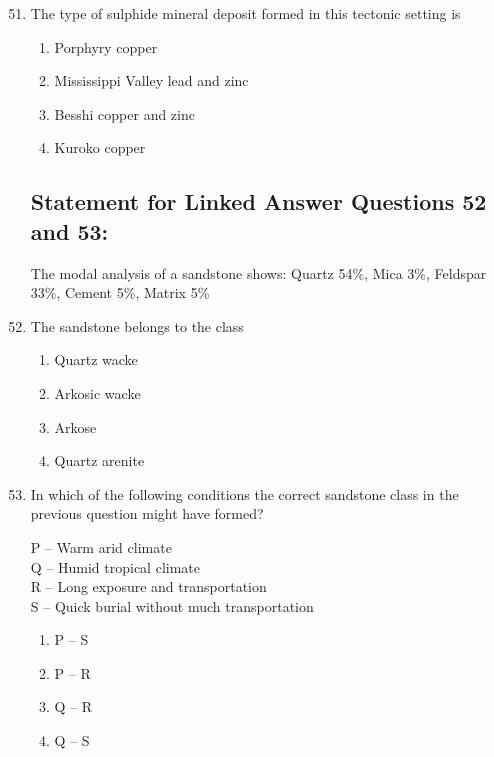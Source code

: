 \documentclass[journal,12pt,onecolumn]{IEEEtran}
\theoremstyle{remark}
\begin{document}
\begin{enumerate}
\setcounter{enumi}{50}

\item The type of sulphide mineral deposit formed in this tectonic setting is
\begin{multicols}{2}
\begin{enumerate}
\item Porphyry copper  
\item Mississippi Valley lead and zinc  
\item Besshi copper and zinc  
\item Kuroko copper  
\end{enumerate}
\end{multicols}


\subsection*{Statement for Linked Answer Questions 52 and 53: }  
\vspace{0.5cm}

The modal analysis of a sandstone shows: Quartz 54\%, Mica 3\%, Feldspar 33\%, Cement 5\%, Matrix 5\%
\vspace{0.5cm}


\item The sandstone belongs to the class  
\begin{multicols}{4}
\begin{enumerate}
\item Quartz wacke  
\item Arkosic wacke  
\item Arkose  
\item Quartz arenite  
\end{enumerate}
\end{multicols}

\item In which of the following conditions the correct sandstone class in the previous question might have formed?

\begin{flushleft}
P -- Warm arid climate\\
Q -- Humid tropical climate\\
R -- Long exposure and transportation\\
S -- Quick burial without much transportation
\end{flushleft}

\begin{multicols}{4}
\begin{enumerate}
\item P -- S  
\item P -- R  
\item Q -- R  
\item Q -- S  
\end{enumerate}
\end{multicols}



\end{enumerate}
\end{document}
